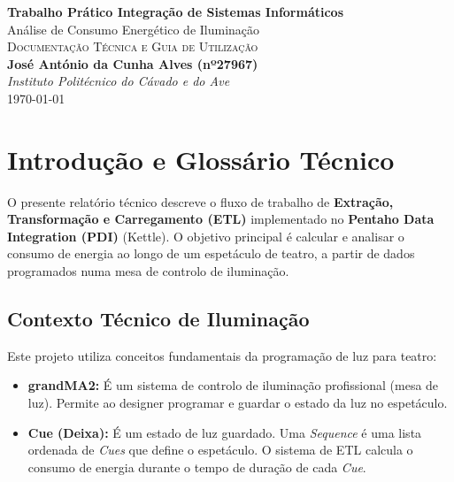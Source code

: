 \documentclass[a4paper, 12pt]{article}
\renewcommand{\maketitle}{
	\begin{titlepage}
		\begin{center}
			\vspace*{1cm}
			{\Huge\textbf{Trabalho Prático Integração de Sistemas Informáticos}}\\[0.5cm] %
			{\Large Análise de Consumo Energético de Iluminação}\\[2cm] %
			{\large \textsc{Documentação Técnica e Guia de Utilização}}\\[0.5cm]
			{\large \textbf{José António da Cunha Alves (nº27967)}}\\[0.5cm] %
			{\textit{Instituto Politécnico do Cávado e do Ave}}\\[1.5cm] %
			{\large \today} %
			\vfill
		\end{center}
	\end{titlepage}
}
\begin{document}
	\maketitle
	\thispagestyle{empty} %
	
	\newpage
	\renewcommand{\contentsname}{Índice}
	\tableofcontents
	
	\newpage
	\renewcommand{\listfigurename}{Lista de Figuras}
	\listoffigures
	
	\newpage
	\section{Introdução e Glossário Técnico}
	
	O presente relatório técnico descreve o fluxo de trabalho de \textbf{Extração, Transformação e Carregamento (ETL)} implementado no \textbf{Pentaho Data Integration (PDI)} (Kettle). O objetivo principal é calcular e analisar o consumo de energia ao longo de um espetáculo de teatro, a partir de dados programados numa mesa de controlo de iluminação.
	
	\subsection{Contexto Técnico de Iluminação}
	
	Este projeto utiliza conceitos fundamentais da programação de luz para teatro:
	
	\begin{itemize}
		\item \textbf{grandMA2:} É um sistema de controlo de iluminação profissional (mesa de luz). Permite ao designer programar e guardar o estado da luz no espetáculo.
		\item \textbf{Cue (Deixa):} É um estado de luz guardado. Uma \textit{Sequence} é uma lista ordenada de \textit{Cues} que define o espetáculo. O sistema de ETL calcula o consumo de energia durante o tempo de duração de cada \textit{Cue}.
	\end{itemize}
	
\end{document}

